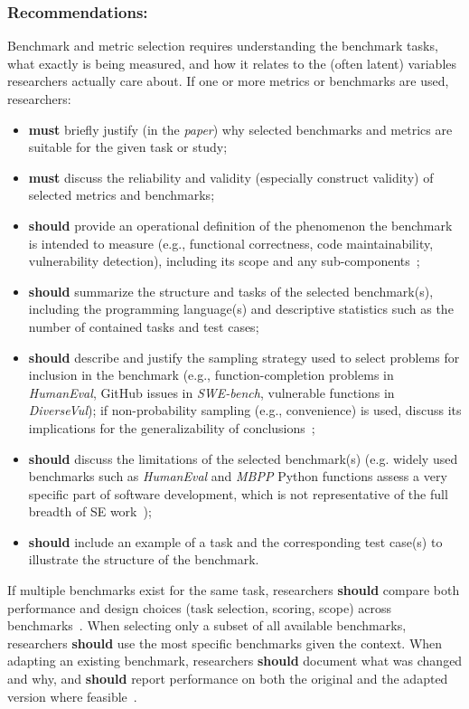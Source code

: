 \documentclass[smallextended]{svjour3}
\newcommand{\must}{\textbf{must}\xspace}
\newcommand{\should}{\textbf{should}\xspace}
\newcommand{\paper}{\emph{paper}\xspace}
\newcommand{\paper}{\emph{paper}\xspace}
\newcommand{\guidelinesubsubsection}[1]{\subsubsection{\bfseries #1:}}
\newcommand{\guidelinesubsubsection}[1]{\subsubsection{#1}}
\begin{document}
\guidelinesubsubsection{Recommendations}

Benchmark and metric selection requires understanding the benchmark tasks, what exactly is being measured, and how it relates to the (often latent) variables researchers actually care about. If one or more metrics or benchmarks are used, researchers:
\begin{itemize}
    \item \must briefly justify (in the \paper) why selected benchmarks and metrics are suitable for the given task or study;
    \item \must discuss the reliability and validity (especially construct validity) of selected metrics and benchmarks;
    \item \should provide an operational definition of the phenomenon the benchmark is intended to measure (e.g., functional correctness, code maintainability, vulnerability detection), including its scope and any sub-components~\cite{bean2025measuring};
    \item \should summarize the structure and tasks of the selected benchmark(s), including the programming language(s) and descriptive statistics such as the number of contained tasks and test cases;
    \item \should describe and justify the sampling strategy used to select problems for inclusion in the benchmark (e.g., function-completion problems in \emph{HumanEval}, GitHub issues in \emph{SWE-bench}, vulnerable functions in \emph{DiverseVul}); if non-probability sampling (e.g., convenience) is used, discuss its implications for the generalizability of conclusions~\cite{DBLP:journals/ese/BaltesR22, bean2025measuring};
    \item \should discuss the limitations of the selected benchmark(s) (e.g. widely used benchmarks such as \emph{HumanEval} \cite{DBLP:journals/corr/abs-2107-03374} and \emph{MBPP} \cite{DBLP:journals/corr/abs-2108-07732} Python functions assess a very specific part of software development, which is not representative of the full breadth of SE work~\cite{Chandra2025benchmarks});
    \item \should include an example of a task and the corresponding test case(s) to illustrate the structure of the benchmark.
\end{itemize}

If multiple benchmarks exist for the same task, researchers \should compare both performance and design choices (task selection, scoring, scope) across benchmarks~\cite{bean2025measuring}.
When selecting only a subset of all available benchmarks, researchers \should use the most specific benchmarks given the context.
When adapting an existing benchmark, researchers \should document what was changed and why, and \should report performance on both the original and the adapted version where feasible~\cite{bean2025measuring}.
\end{document}
